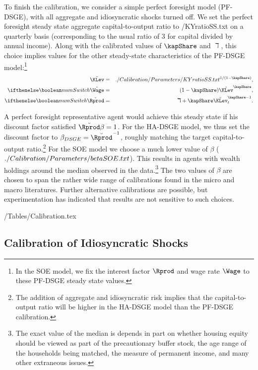 \documentclass[titlepage]{\econtex}\newcommand{\texname}{cAndCwithStickyE}
\begin{document}
To finish the calibration, we consider a simple perfect foresight model (PF-DSGE), with all aggregate and idiosyncratic shocks turned off.  We set the perfect foresight steady state aggregate capital-to-output ratio to  \ParmDir/KYratioSS.txt on a quarterly basis (corresponding to the usual ratio of 3 for capital divided by annual income).  Along with the calibrated values of $\kapShare$ and $\daleth$, this choice implies values for the other steady-state characteristics of the PF-DSGE model:\footnote{In the SOE model, we fix the interest factor $\Rprod$ and wage rate $\Wage$ to these PF-DSGE steady state values.}
\begin{eqnarray*}
   \breve{\KLev} & = &  \ParmDir/KYratioSS.txt ^{1/(1-\kapShare)},
\\ \ifnumSw \breve{\Wage} & = & (1-\kapShare) \breve{\KLev}^{\kapShare},
\\ \ifnumSw \breve{\Rprod} & = & \daleth+\kapShare \breve{\KLev}^{\kapShare-1}_{t}
.
\end{eqnarray*}

A perfect foresight representative agent would achieve this steady state if his discount factor satisfied $\breve{\Rprod} \beta = 1$.  For the HA-DSGE model, we thus set the discount factor to $\beta_{DSGE} = \breve{\Rprod}^{-1}$, roughly matching the target capital-to-output ratio.\footnote{The addition of aggregate and idiosyncratic risk implies that the capital-to-output ratio will be higher in the HA-DSGE model than the PF-DSGE calibration.} For the SOE model we choose a much lower value of $\beta$ ($  ./Calibration/Parameters/betaSOE.txt $). This results in agents with wealth holdings around the median observed in the data.\footnote{The exact value of the median is depends in part on whether housing equity should be viewed as part of the precautionary buffer stock, the age range of the households being matched, the measure of permanent income, and many other extraneous issues.}  The two values of $\beta$ are chosen to span the rather wide range of calibrations found in the micro and macro literatures.  Further alternative calibrations are possible, but experimentation has indicated that results are not sensitive to such choices.

\econtexRoot/Tables/Calibration.tex

\subsection{Calibration of Idiosyncratic Shocks}
\end{document}
